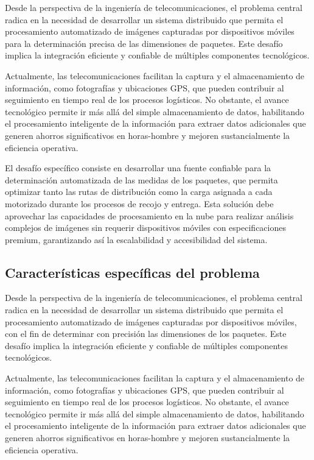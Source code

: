 Desde la perspectiva de la ingeniería de telecomunicaciones, el problema central radica en la necesidad de desarrollar un sistema distribuido que permita el procesamiento automatizado de imágenes capturadas por dispositivos móviles para la determinación precisa de las dimensiones de paquetes. Este desafío implica la integración eficiente y confiable de múltiples componentes tecnológicos.

Actualmente, las telecomunicaciones facilitan la captura y el almacenamiento de información, como fotografías y ubicaciones GPS, que pueden contribuir al seguimiento en tiempo real de los procesos logísticos. No obstante, el avance tecnológico permite ir más allá del simple almacenamiento de datos, habilitando el procesamiento inteligente de la información para extraer datos adicionales que generen ahorros significativos en horas-hombre y mejoren sustancialmente la eficiencia operativa.

El desafío específico consiste en desarrollar una fuente confiable para la determinación automatizada de las medidas de los paquetes, que permita optimizar tanto las rutas de distribución como la carga asignada a cada motorizado durante los procesos de recojo y entrega. Esta solución debe aprovechar las capacidades de procesamiento en la nube para realizar análisis complejos de imágenes sin requerir dispositivos móviles con especificaciones premium, garantizando así la escalabilidad y accesibilidad del sistema.

\subsection{Características específicas del problema}

Desde la perspectiva de la ingeniería de telecomunicaciones, el problema central radica en la necesidad de desarrollar un sistema distribuido que permita el procesamiento automatizado de imágenes capturadas por dispositivos móviles, con el fin de determinar con precisión las dimensiones de los paquetes. Este desafío implica la integración eficiente y confiable de múltiples componentes tecnológicos.

Actualmente, las telecomunicaciones facilitan la captura y el almacenamiento de información, como fotografías y ubicaciones GPS, que pueden contribuir al seguimiento en tiempo real de los procesos logísticos. No obstante, el avance tecnológico permite ir más allá del simple almacenamiento de datos, habilitando el procesamiento inteligente de la información para extraer datos adicionales que generen ahorros significativos en horas-hombre y mejoren sustancialmente la eficiencia operativa.

